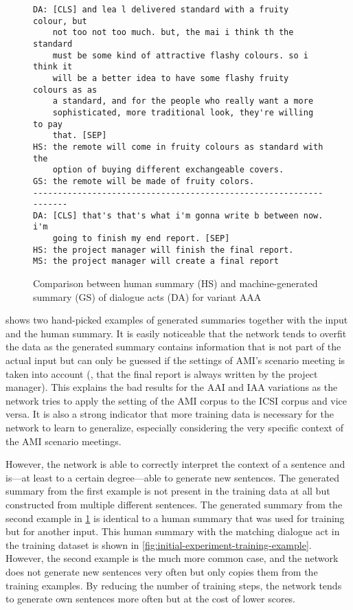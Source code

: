 \begin{figure}[h]
\begin{lstlisting}[numbers=none]
DA: [CLS] and lea l delivered standard with a fruity colour, but
    not too not too much. but, the mai i think th the standard
    must be some kind of attractive flashy colours. so i think it
    will be a better idea to have some flashy fruity colours as as
    a standard, and for the people who really want a more
    sophisticated, more traditional look, they're willing to pay
    that. [SEP]
HS: the remote will come in fruity colours as standard with the
    option of buying different exchangeable covers.
GS: the remote will be made of fruity colors.
------------------------------------------------------------------
DA: [CLS] that's that's what i'm gonna write b between now. i'm
    going to finish my end report. [SEP]
HS: the project manager will finish the final report.
MS: the project manager will create a final report
\end{lstlisting}
\caption{Comparison between human summary (HS) and machine-generated summary (GS) of dialogue acts (DA) for variant AAA}
\label{fig:initial-experiment-example}
\end{figure}

 shows two hand-picked examples of generated summaries together with the input and the human summary.
It is easily noticeable that the network tends to overfit the data as the generated summary contains information that is not part of the actual input but can only be guessed if the settings of AMI's scenario meeting is taken into account (\eg, that the final report is always written by the project manager).
This explains the bad results for the AAI and IAA variations as the network tries to apply the setting of the AMI corpus to the ICSI corpus and vice versa.
It is also a strong indicator that more training data is necessary for the network to learn to generalize, especially considering the very specific context of the AMI scenario meetings.

However, the network is able to correctly interpret the context of a sentence and is---at least to a certain degree---able to generate new sentences.
The generated summary from the first example is not present in the training data at all but constructed from multiple different sentences.
The generated summary from the second example in \cref{fig:initial-experiment-example} is identical to a human summary that was used for training but for another input.
This human summary with the matching dialogue act in the training dataset is shown in \cref{fig:initial-experiment-training-example}.
However, the second example is the much more common case, and the network does not generate new sentences very often but only copies them from the training examples.
By reducing the number of training steps, the network tends to generate own sentences more often but at the cost of lower scores.

